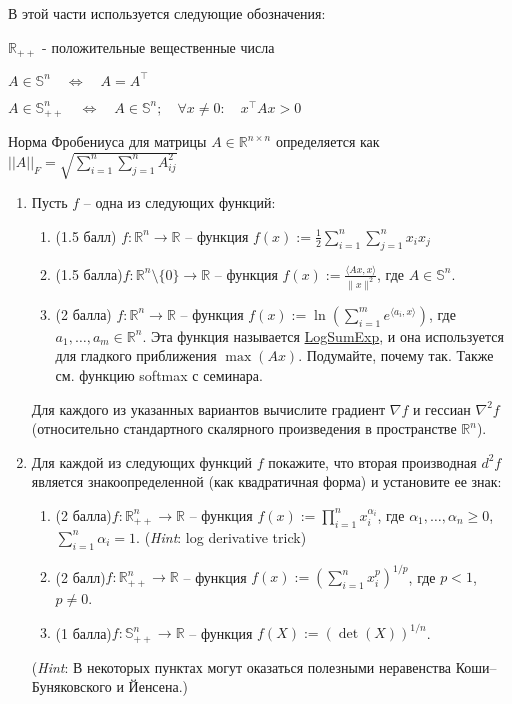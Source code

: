 \documentclass[a5paper,twoside,russian,8pt]{article}
\def  \R {\mathbb R}
\newcommand{\St}{\mathbb{S}}
\begin{document}
В этой части используется следующие обозначения:

$\mathbb{R}_{++}$ - положительные вещественные числа

$A \in \mathbb{S}^n \quad\Longleftrightarrow \quad A= A^\top$

$A \in \mathbb{S}^n_{++}\quad \Longleftrightarrow \quad A \in \mathbb{S}^n ; \quad \forall x \neq 0: \quad  x^\top Ax > 0$

Норма Фробениуса для матрицы $A \in \mathbb{R}^{n \times n}$ определяется как $||A||_F = \sqrt{\sum_{i=1}^n \sum_{j=1}^n A^2_{ij}}$

\begin{enumerate}[label=\textbf{Задача \arabic*.}]

   \item Пусть $f$ -- одна из следующих функций:
    \begin{enumerate}
        \item (1.5 балл) $f : \R^n \to \R$ -- функция $\displaystyle f(x) := \frac{1}{2} \sum\limits_{i=1}^n\sum\limits_{j=1}^nx_ix_j$
        \item (1.5 балла)$f : \R^n \setminus \{ 0 \} \to \R$ -- функция $\displaystyle f(x) := \frac{\langle A x, x \rangle}{ \|x\|^2 }$, где $A \in \St^n$.
        \item (2 балла) $f: \R^n \to \R$ -- функция $f(x) := \ln(\sum_{i=1}^m e^{\langle a_i, x \rangle})$, где $a_1, \dots, a_m \in \R^n$. 
        Эта функция называется \href{https://en.wikipedia.org/wiki/LogSumExp}{LogSumExp}, и она используется для гладкого приближения $\max(Ax)$. Подумайте, почему так. Также см. функцию softmax с семинара.
    \end{enumerate}
    Для каждого из указанных вариантов вычислите градиент $\nabla f$ и гессиан $\nabla^2 f$ (относительно стандартного скалярного произведения в пространстве $\R^n$).

    \item Для каждой из следующих функций $f$ покажите, что вторая производная $d^2 f$ является знакоопределенной (как квадратичная форма) и установите ее знак:
    \begin{enumerate}
        \item (2 балла)$f : \R^n_{++} \to \R$ -- функция $f(x) := \prod_{i=1}^n x_i^{\alpha_i}$, где $\alpha_1, \dots, \alpha_n \geq 0$, $\sum_{i=1}^n \alpha_i = 1$. (\emph{Hint}: log derivative trick)
        \item (2 балл)$f : \R^n_{++} \to \R$ -- функция $f(x) := \left( \sum_{i=1}^n x_i^p \right)^{1/p}$, где $p < 1$, $p \neq 0$.
        \item (1 балла)$f : \St^n_{++} \to \R$ -- функция $f(X) := (\det(X))^{1/n}$.
    \end{enumerate}
    (\emph{Hint}: В некоторых пунктах могут оказаться полезными неравенства Коши--Буняковского и Йенсена.)
        
\end{enumerate}
\end{document}
